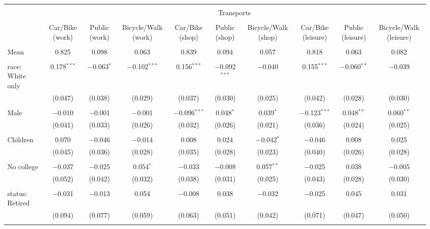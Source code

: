 
\begin{tabular}{@{\extracolsep{5pt}}lccccccccc} 
\\[-1.8ex]\hline 
\hline \\[-1.8ex] 
 & \multicolumn{9}{c}{Transports} \\ 
\cline{2-10} 
\\[-1.8ex] & Car/Bike (work) & Public (work) & Bicycle/Walk (work) & Car/Bike (shop) & Public (shop) & Bicycle/Walk (shop) & Car/Bike (leisure) & Public (leisure) & Bicycle/Walk (leisure) \\ 
\hline \\[-1.8ex] 
 Mean & 0.825 & 0.098 & 0.063 & 0.839 & 0.094 & 0.057 & 0.818 & 0.063 & 0.082  \\ \hline \\[-1.8ex] race: White only & 0.178$^{***}$ & $-$0.063$^{*}$ & $-$0.102$^{***}$ & 0.156$^{***}$ & $-$0.092$^{***}$ & $-$0.040 & 0.155$^{***}$ & $-$0.060$^{**}$ & $-$0.039 \\ 
  & (0.047) & (0.038) & (0.029) & (0.037) & (0.030) & (0.025) & (0.042) & (0.028) & (0.030) \\ 
  & & & & & & & & & \\ 
 Male & $-$0.010 & $-$0.001 & $-$0.001 & $-$0.096$^{***}$ & 0.048$^{*}$ & 0.039$^{*}$ & $-$0.123$^{***}$ & 0.048$^{**}$ & 0.060$^{**}$ \\ 
  & (0.041) & (0.033) & (0.026) & (0.032) & (0.026) & (0.021) & (0.036) & (0.024) & (0.025) \\ 
  & & & & & & & & & \\ 
 Children & 0.070 & $-$0.046 & $-$0.014 & 0.008 & 0.024 & $-$0.042$^{*}$ & $-$0.046 & 0.008 & 0.025 \\ 
  & (0.045) & (0.036) & (0.028) & (0.035) & (0.028) & (0.023) & (0.040) & (0.026) & (0.028) \\ 
  & & & & & & & & & \\ 
 No college & $-$0.037 & $-$0.025 & 0.054$^{*}$ & $-$0.033 & $-$0.008 & 0.057$^{**}$ & $-$0.025 & 0.038 & $-$0.005 \\ 
  & (0.052) & (0.042) & (0.032) & (0.038) & (0.031) & (0.025) & (0.043) & (0.028) & (0.030) \\ 
  & & & & & & & & & \\ 
 status: Retired & $-$0.031 & $-$0.013 & 0.054 & $-$0.008 & 0.038 & $-$0.032 & $-$0.025 & 0.045 & 0.031 \\ 
  & (0.094) & (0.077) & (0.059) & (0.063) & (0.051) & (0.042) & (0.071) & (0.047) & (0.050) \\ 
  & & & & & & & & & \\ 

\end{tabular}
